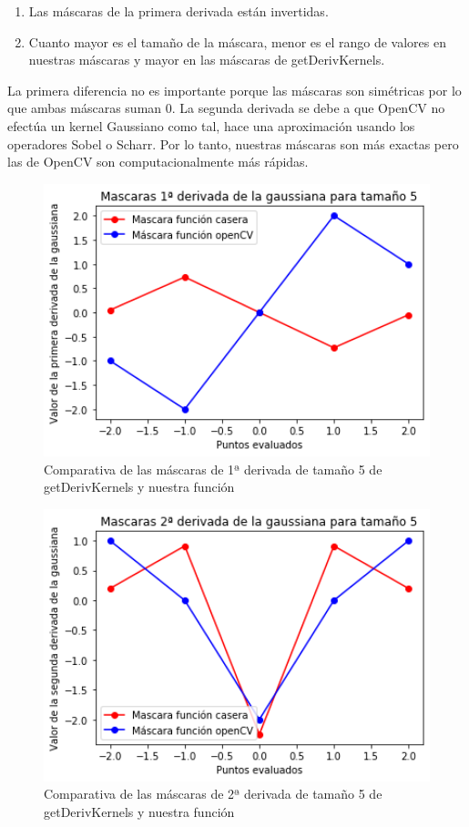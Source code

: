 \documentclass[12pt,spanish]{article}
\begin{document}
\begin{enumerate}
	\item Las máscaras de la primera derivada están invertidas.
	\item Cuanto mayor es el tamaño de la máscara, menor es el rango de valores en nuestras máscaras y mayor en las máscaras de getDerivKernels.
\end{enumerate}

La primera diferencia no es importante porque las máscaras son simétricas por lo que ambas máscaras suman 0. La segunda derivada se debe a que OpenCV no efectúa un kernel Gaussiano como tal, hace una aproximación usando los operadores Sobel o Scharr. Por lo tanto, nuestras máscaras son más exactas pero las de OpenCV son computacionalmente más rápidas.


\begin{figure}[H]
	\centering
	\includegraphics[width=12cm, scale=1]{./imagenes_memoria/1d_t5.png}
	\caption{Comparativa de las máscaras de 1ª derivada de tamaño 5 de getDerivKernels y nuestra función}
	\label{mask_1d_t5}
\end{figure}

\begin{figure}[H]
	\centering
	\includegraphics[width=12cm]{./imagenes_memoria/2d_t5.png}
	\caption{Comparativa de las máscaras de 2ª derivada de tamaño 5 de getDerivKernels y nuestra función}
	\label{mask_2d_t5}
\end{figure}
\end{document}
